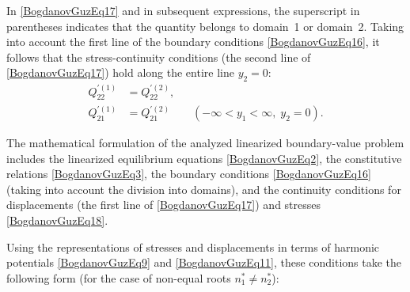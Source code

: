 In \eqref{BogdanovGuzEq17} and in subsequent expressions, the superscript in parentheses indicates that the quantity belongs to domain~1 or domain~2. Taking into account the first line of the boundary conditions \eqref{BogdanovGuzEq16}, it follows that the stress-continuity conditions (the second line of \eqref{BogdanovGuzEq17}) hold along the entire line $y_{2}=0$:
\begin{equation}
	\label{BogdanovGuzEq18}
	\begin{aligned}
		Q_{22}^{\prime (1)} &= Q_{22}^{\prime (2)},\\
		Q_{21}^{\prime (1)} &= Q_{21}^{\prime (2)}
		\qquad (-\infty < y_{1} < \infty,\; y_{2}=0).
	\end{aligned}
\end{equation}

The mathematical formulation of the analyzed linearized boundary-value problem includes the linearized equilibrium equations \eqref{BogdanovGuzEq2}, the constitutive relations \eqref{BogdanovGuzEq3}, the boundary conditions \eqref{BogdanovGuzEq16} (taking into account the division into domains), and the continuity conditions for displacements (the first line of \eqref{BogdanovGuzEq17}) and stresses \eqref{BogdanovGuzEq18}. 

Using the representations of stresses and displacements in terms of harmonic potentials \eqref{BogdanovGuzEq9} and \eqref{BogdanovGuzEq11}, these conditions take the following form (for the case of non-equal roots $n_{1}^{*} \neq n_{2}^{*}$):

